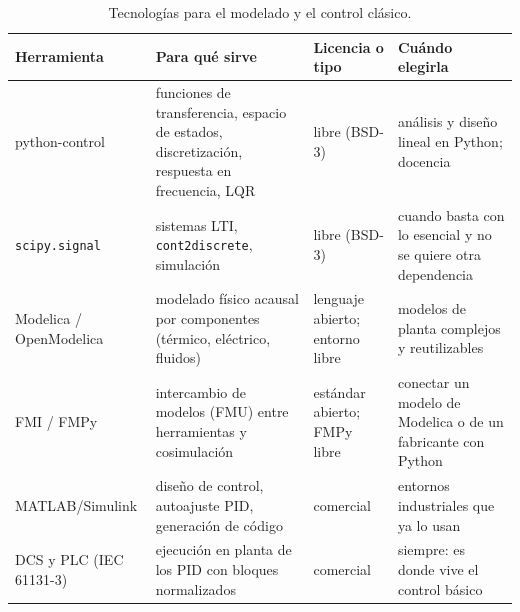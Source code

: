 \begin{table}[htbp]
\centering\footnotesize
\begin{tabularx}{\textwidth}{@{}>{\raggedright\arraybackslash}p{3.1cm}>{\raggedright\arraybackslash}X>{\raggedright\arraybackslash}p{2.0cm}>{\raggedright\arraybackslash}X@{}}
\toprule
Herramienta & Para qué sirve & Licencia o tipo & Cuándo elegirla \\
\midrule
python-control~\cite{pycontrol} & funciones de transferencia, espacio de estados, discretización, respuesta en frecuencia, LQR & libre (BSD-3) & análisis y diseño lineal en Python; docencia \\
\texttt{scipy.signal} & sistemas LTI, \texttt{cont2discrete}, simulación & libre (BSD-3) & cuando basta con lo esencial y no se quiere otra dependencia \\
Modelica / OpenModelica~\cite{modelica} & modelado físico acausal por componentes (térmico, eléctrico, fluidos) & lenguaje abierto; entorno libre & modelos de planta complejos y reutilizables \\
FMI / FMPy~\cite{fmi} & intercambio de modelos (FMU) entre herramientas y cosimulación & estándar abierto; FMPy libre & conectar un modelo de Modelica o de un fabricante con Python \\
MATLAB/Simulink & diseño de control, autoajuste PID, generación de código & comercial & entornos industriales que ya lo usan \\
DCS y PLC (IEC 61131-3) & ejecución en planta de los PID con bloques normalizados & comercial & siempre: es donde vive el control básico \\
\bottomrule
\end{tabularx}
\caption{Tecnologías para el modelado y el control clásico.}
\label{tab:tec1}
\end{table}

\addtocounter{definicion}{1}%

